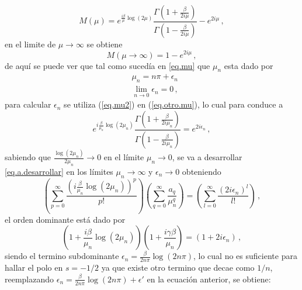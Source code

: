 \begin{equation}
M (\mu) = e ^{\frac{i \beta }{\mu} \log(2 \mu) }
\frac{\Gamma (1 + \frac{ \beta}{2 i \mu})}{\Gamma (1 - \frac{ \beta}{2 i \mu})}
- e ^{2 i \mu}
\, ,
\label{eq.otro.mu}
\end{equation}
en el limite de $\mu  \rightarrow \infty$ se obtiene
\begin{equation}
    M(\mu  \rightarrow \infty) = 
	1 - e ^{2 i \mu}
		\, ,
\end{equation}
de aquí se puede ver que tal como sucedía en \ref{eq.mu} que $\mu _n$ esta dado por
\begin{equation}
\begin{aligned}
    &\mu _n = n \pi + \epsilon _n \\[5pt]
	&\lim \limits _{n \rightarrow{0}} \epsilon _n  = 0
		\, ,
\end{aligned}
\label{eq.mu2}
\end{equation}
para calcular $\epsilon _n$ se utiliza (\ref{eq.mu2}) en (\ref{eq.otro.mu}), lo cual para conduce a
\begin{equation}
	e ^{ i \frac{\beta}{ \mu _n} \log (2 \mu _n)}     
    \frac{\Gamma(1 + \frac{ \beta}{2  i \mu _n} ) }
    {\Gamma(1 -  \frac{ \beta}{2  i \mu _n} )} =    
    e ^{2 i \epsilon _n }
    	\, ,
\label{eq.a.desarrollar}
\end{equation}
sabiendo que $\frac{\log (2 \mu _n)}{2 \mu _n } \rightarrow 0$ en el límite $\mu _n \rightarrow 0$, se va a desarrollar \ref{eq.a.desarrollar} en los límites $ \mu _n \rightarrow \infty $ y $\epsilon _n \rightarrow 0$ obteniendo
\begin{equation}
    \left(
    \sum _{p = 0} ^{\infty} \frac{ \left( i \frac{\beta}{ \mu _n } \log(2 \mu _n ) \right) ^p }{p!}
    \right)
    \left(
	\sum _{q = 0} ^{\infty} \frac{a _q}{\mu _n ^q}
	\right)
    =
    \left(
    \sum _{l = 0} ^{\infty} \frac{( 2 i \epsilon _n)^l}{l !}
    \right)
    	\, ,
\end{equation}
el orden dominante está dado por
\begin{equation}
\left( 1 + \frac{i \beta}{ \mu _n} \log ( 2 \mu _n) \right) 
\left(1 + \frac{i  \gamma \beta}{ \mu _n} \right)  =
(1 + 2 i \epsilon _n) \, ,
\end{equation}
siendo el termino subdominante $\epsilon _n =  \frac{\beta }{2 n \pi}  \log (2 n \pi)$, lo cual no es suficiente para hallar el polo en $s=-1/2$ ya que existe otro termino que decae como $1/n$, reemplazando $\epsilon _n =  \frac{\beta }{2 n \pi} \log (2 n \pi) + \epsilon '$ en la ecuación anterior, se obtiene:
